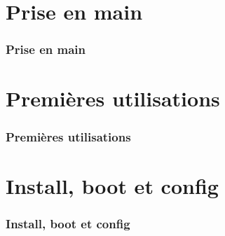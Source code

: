 \documentclass{beamer}
\begin{document}
    \section{Prise en main}
        \begin{frame}
            \frametitle{Prise en main}
        \end{frame}
    \section{Premières utilisations}
        \begin{frame}
                \frametitle{Premières utilisations}
        \end{frame}
    \section{Install, boot et config}
        \begin{frame}
            \frametitle{Install, boot et config}
        \end{frame}
\end{document}

